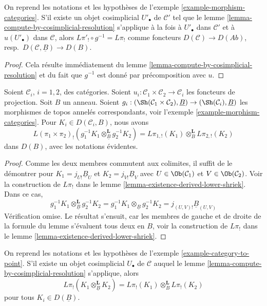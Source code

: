 \begin{lemma}
\label{lemma-get-it-now}
On reprend les notations et les hypothèses de
l'exemple \ref{example-morphism-categories}. S'il existe un objet
cosimplicial $U'_\bullet$ de $\mathcal{C}'$ tel que le
lemme \ref{lemma-compute-by-cosimplicial-resolution} s'applique à la fois à
$U'_\bullet$ dans $\mathcal{C}'$ et à $u(U'_\bullet)$ dans $\mathcal{C}$,
alors $L\pi'_! \circ g^{-1} = L\pi_!$ comme foncteurs
$D(\mathcal{C}) \to D(\textit{Ab})$,
resp.\ $D(\mathcal{C}, \underline{B}) \to D(B)$.
\end{lemma}

\begin{proof}
Cela résulte immédiatement du
lemme \ref{lemma-compute-by-cosimplicial-resolution} et du fait que
$g^{-1}$ est donné par précomposition avec $u$.
\end{proof}

\begin{lemma}
\label{lemma-product-categories}
Soient $\mathcal{C}_i$, $i = 1, 2$, des catégories. Soient
$u_i : \mathcal{C}_1 \times \mathcal{C}_2 \to \mathcal{C}_i$ les foncteurs
de projection. Soit $B$ un anneau. Soient
$g_i : (\Sh(\mathcal{C}_1 \times \mathcal{C}_2), \underline{B}) \to
(\Sh(\mathcal{C}_i), \underline{B})$ les morphismes de topos annelés
correspondants, voir l'exemple \ref{example-morphism-categories}. Pour
$K_i \in D(\mathcal{C}_i, B)$, nous avons
$$
L(\pi_1 \times \pi_2)_!(
g_1^{-1}K_1 \otimes_{\underline{B}}^\mathbf{L} g_2^{-1}K_2)
=
L\pi_{1, !}(K_1) \otimes_B^\mathbf{L} L\pi_{2, !}(K_2)
$$
dans $D(B)$, avec les notations évidentes.
\end{lemma}

\begin{proof}
Comme les deux membres commutent aux colimites, il suffit de le démontrer pour
$K_1 = j_{U!}\underline{B}_U$ et $K_2 = j_{V!}\underline{B}_V$
avec $U \in \Ob(\mathcal{C}_1)$ et $V \in \Ob(\mathcal{C}_2)$.
Voir la construction de $L\pi_!$ dans le
lemme \ref{lemma-existence-derived-lower-shriek}. Dans ce cas,
$$
g_1^{-1}K_1 \otimes_{\underline{B}}^\mathbf{L} g_2^{-1}K_2 =
g_1^{-1}K_1 \otimes_{\underline{B}} g_2^{-1}K_2 =
j_{(U, V)!}\underline{B}_{(U, V)}
$$
Vérification omise. Le résultat s'ensuit, car les membres de gauche et de
droite de la formule du lemme s'évaluent tous deux en $B$, voir la
construction de $L\pi_!$ dans le
lemme \ref{lemma-existence-derived-lower-shriek}.
\end{proof}

\begin{lemma}
\label{lemma-eilenberg-zilber}
On reprend les notations et les hypothèses de
l'exemple \ref{example-category-to-point}. S'il existe un objet cosimplicial
$U_\bullet$ de $\mathcal{C}$ auquel le
lemme \ref{lemma-compute-by-cosimplicial-resolution} s'applique, alors
$$
L\pi_!(K_1 \otimes^\mathbf{L}_{\underline{B}} K_2) =
L\pi_!(K_1) \otimes^\mathbf{L}_B L\pi_!(K_2)
$$
pour tous $K_i \in D(\underline{B})$.
\end{lemma}

